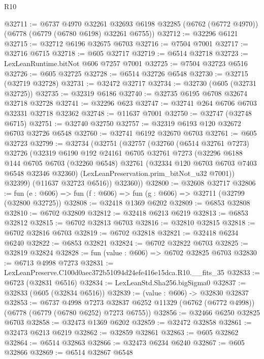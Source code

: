 \begin{lexlean}{R10}
\begin{coremodule}
@32711 := @6737
    @4970
    @32261
    @32693
    @6198
    @32285
    (@6762 (@6772 @4970))
    (@6778 (@6779 (@6780 @6198) @32261 @6755))
@32712 := @32296 @6121
@32715 := @32712 @6196 @32675 @6703
@32716 := @7504 @7001
@32717 := @32716 @6715
@32718 := @605 @32717
@32719 := @6514 @32718
@32723 := LexLeanRuntime.bitNot @606 @7257 @7001
@32725 := @7504 @32723 @6516
@32726 := @605 @32725
@32728 := @6514 @32726 @6548
@32730 := @32715 (@32719 @32728)
@32731 := @32472 @32717
@32734 := @32730 (@605 (@32731 @32725))
@32735 := @32319 @6186
@32740 := @32735 @6195 @6708 @32674 @32718 @32728
@32741 := @32296 @623
@32747 := @32741 @264 @6706 @6703 @32331 @32718 @32362
@32748 := @11637 @7001
@32750 := @32747 (@32748 @6715)
@32751 := @32740 @32750
@32757 := @32319 @6193 @120 @32672 @6703 @32726 @6548
@32760 := @32741 @6192 @32670 @6703
@32761 := @605 @32723
@32799 := @32734
    (@32751
      (@32757
        (@32760
          (@6514 @32761 @7273)
          @32726
          (@32319
            @6190
            @192
            @24161
            @6705
            @32761
            @7273
            (@32296
              @6188
              @144
              @6705
              @6703
              (@32260 @6548)
              @32761
              (@32334 @120 @6703 @6703 @7403 @6548 @32346 @32360)
              (LexLeanPreservation.prim_bitNot_u32 @7001))
            @32399)
          (@11637 @32723 @6516))
        @32360))
@32800 := @32608 @32717
@32806 := fun (e : @606) => fun (f : @606) => fun (g : @606) => @32711 (@32799 (@32800 @32725))
@32808 := @32418 @1369 @6202
@32809 := @6853 @32808
@32810 := @6702 @32809
@32812 := @32418 @6213 @6219
@32813 := @6853 @32812
@32815 := @6702 @32813 @6703
@32816 := @32810 @32815
@32818 := @6702 @32816 @6703
@32819 := @6702 @32818
@32821 := @32418 @6234 @6240
@32822 := @6853 @32821
@32824 := @6702 @32822 @6703
@32825 := @32819 @32824
@32828 := fun (value : @606) => @6702 @32825 @6703
@32830 := @6713 @4998 @7273
@32831 := LexLeanPreserve.C100d0aec372b51094d24efe416e15dca.R10.__fits_35
@32833 := @6723 (@32831 @6516)
@32834 := LexLeanStd.Sha256.bigSigma0
@32837 := @32833 (@605 (@32834 @6516))
@32839 := (value : @606) -> @32830 @32837
@32853 := @6737
    @4998
    @7273
    @32837
    @6252
    @11329
    (@6762 (@6772 @4998))
    (@6778 (@6779 (@6780 @6252) @7273 @6755))
@32856 := @32466 @6250 @32825 @6703
@32858 := @32473 @1369 @6202
@32859 := @32472 @32858
@32861 := @32473 @6213 @6219
@32862 := @32859 @32861
@32863 := @605 @32862
@32864 := @6514 @32863
@32866 := @32473 @6234 @6240
@32867 := @605 @32866
@32869 := @6514 @32867 @6548

\end{coremodule}
\end{lexlean}
